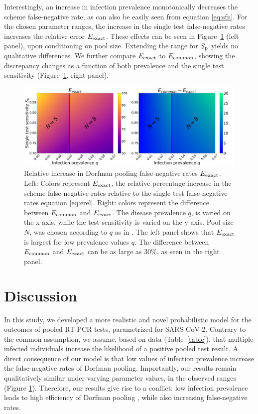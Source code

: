 \documentclass{article}
\begin{document}
Interestingly, an increase in infection prevalence monotonically
decreases the scheme false-negative rate, as can also be easily seen
from equation \eqref{eq:sfn}. For the chosen parameter ranges, the increase in
the single test false-negative rates increases the relative error
$E_{\text{{exact}}}$. These effects can be seen in Figure~\ref{fig1} (left
panel), upon conditioning on pool size. Extending the range for $S_\text{p}$
yields no qualitative differences. We further compare $E_{\text{{exact}}}$ to
$E_{\text{{common}}}$, showing the discrepancy changes as a function of both
prevalence and the single test sensitivity (Figure~\ref{fig1}, right
panel).
\begin{figure}[H]
  \centering
  \includegraphics[width=\textwidth]{heatmap_sfn.jpg}
  \caption{Relative increase in Dorfman pooling false-negative rates
    $E_{\text{{exact}}}$. Left: Colors represent $E_{\text{{exact}}}$, the relative
    percentage increase in the scheme false-negative rates relative to
    the single test false-negative rates equation \eqref{eq:erel}. Right:
    colors represent the difference between $E_{\text{{common}}}$ and
    $E_{\text{{exact}}}$. The disease prevalence $q$, is varied on the
    x-axis, while the test sensitivity is varied on the y-axis. Pool
    size $N$, was chosen according to $q$ as in
    \cite{DorfmanYuvalDor}. The left panel shows that $E_{\text{{exact}}}$ is
    largest for low prevalence values $q$. The difference between
    $E_{\text{{common}}}$ and $E_{\text{{exact}}}$ can be as large as 30\%, as seen
    in the right panel. }\label{fig1}
\end{figure}

\section*{Discussion}
In this study, we developed a more realistic and novel probabilistic
model for the outcomes of pooled RT-PCR tests, parametrized for
SARS-CoV-2. Contrary to the common assumption, we assume, based on
data (Table~\ref{table}), that multiple infected individuals increase
the likelihood of a positive pooled test result. A direct consequence
of our model is that low values of infection prevalence increase the
false-negative rates of Dorfman pooling. Importantly, our results
remain qualitatively similar under varying parameter values, in the
observed ranges \cite{KitComparison,EstimatingRatesKucrika,
  EstimatingRatesLourenco, InterpretingCOVID19Test} (Figure
\ref{fig1}). Therefore, our results give rise to a conflict: low
infection prevalence leads to high efficiency of Dorfman pooling
\cite{DorfmanYuvalDor}, while also increasing false-negative rates.
\end{document}
